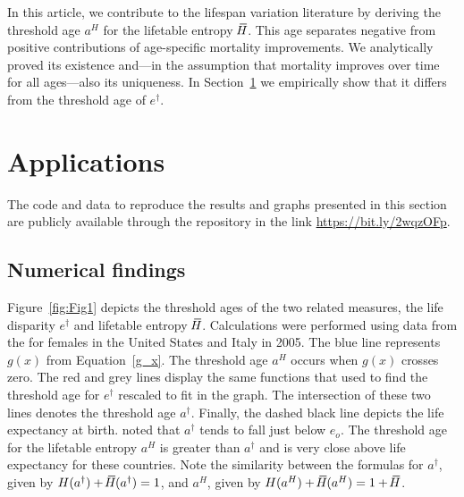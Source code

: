 \documentclass[a4paper,twoside, openright, 12pt, leqno]{article}
\newcommand*\xbar[1]{%
   \hbox{%
     \vbox{%
       \hrule height 0.5pt %
       \kern0.3ex%
       \hbox{%
         \kern-0.28em%
         \ensuremath{#1}%
         \kern-0.05em%
       }%
     }%
   }%
}
\begin{document}
In this article, we contribute to the lifespan variation literature by deriving the threshold age $a^H$ for the lifetable entropy $\,\xbar{H}$. This age separates negative from positive contributions of age-specific mortality improvements. We analytically proved its existence and---in the assumption that mortality improves over time for all ages---also its uniqueness. In Section~\ref{sec:application} we empirically show that it differs from the threshold age of $e^\dagger$.


\section{Applications}
\label{sec:application}

The code and data to reproduce the results and graphs presented in this section are publicly available through the repository in the link \url{https://bit.ly/2wqzOFp}.

\subsection{Numerical findings}

Figure~\ref{fig:Fig1} depicts the threshold ages of the two related measures, the life disparity $e^\dagger$ and lifetable entropy $\,\xbar{H}$. Calculations were performed using data from the \citet{HMD} for females in the United States and Italy in 2005. The blue line represents $g(x)$ from Equation~\eqref{g_x}. The threshold age $a^H$ occurs when  $g(x)$ crosses zero. The red and grey lines display the same functions that \cite{Zhang2009} used to find the threshold age for $e^\dagger$ rescaled to fit in the graph. The intersection of these two lines denotes the threshold age $a^\dagger$. Finally, the dashed black line depicts the life expectancy at birth. \citet{Vaupel2011} noted that $a^\dagger$ tends to fall just below $e_o$. The threshold age for the lifetable entropy $a^H$ is greater than $a^\dagger$ and is very close above life expectancy for these countries. Note the similarity between the formulas for $a^\dagger$, given by $H(a^\dagger)+\,\xbar{H}(a^\dagger)=1$, and $a^H$, given by $H(a^H)+\,\xbar{H}(a^H)= 1+\,\xbar{H}$.
\end{document}
